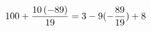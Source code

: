 \documentclass[preview]{standalone}
\begin{document}
\begin{align*}
\special{dvisvgm:raw <g id='unique000'>}100 + \frac{10 \left(-89\right)}{19} = 3 - 9 (- \frac{89}{19}) + 8\special{dvisvgm:raw </g>}
\end{align*}
\end{document}
